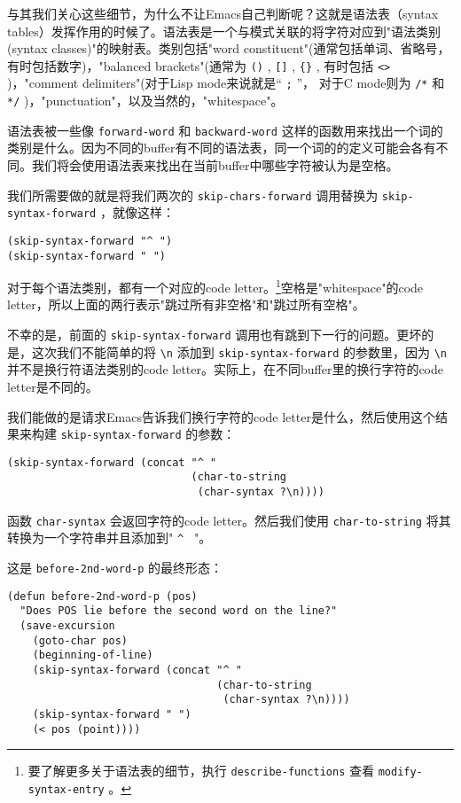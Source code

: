 与其我们关心这些细节，为什么不让Emacs自己判断呢？这就是语法表（syntax tables）发挥作用的时候了。语法表是一个与模式关联的将字符对应到"语法类别(syntax classes)"的映射表。类别包括"word constituent"(通常包括单词、省略号，有时包括数字)，"balanced brackets"(通常为 \verb|()| , \verb|[]| , \verb|{}| , 有时包括 \verb|<>| )，"comment delimiters"(对于Lisp mode来说就是“ \verb|;| ”， 对于C mode则为 \verb|/*| 和 \verb|*/| )，"punctuation"，以及当然的，"whitespace"。

语法表被一些像 \texttt{forward-word} 和 \texttt{backward-word} 这样的函数用来找出一个词的类别是什么。因为不同的buffer有不同的语法表，同一个词的的定义可能会各有不同。我们将会使用语法表来找出在当前buffer中哪些字符被认为是空格。

我们所需要做的就是将我们两次的 \texttt{skip-chars-forward} 调用替换为 \texttt{skip-syntax-forward} ，就像这样：

\begin{verbatim}
(skip-syntax-forward "^ ")
(skip-syntax-forward " ")
\end{verbatim}

对于每个语法类别，都有一个对应的code letter。\footnote{要了解更多关于语法表的细节，执行 \texttt{describe-functions} 查看 \texttt{modify-syntax-entry} 。}空格是"whitespace"的code letter，所以上面的两行表示"跳过所有非空格"和"跳过所有空格"。

不幸的是，前面的 \texttt{skip-syntax-forward} 调用也有跳到下一行的问题。更坏的是，这次我们不能简单的将 \verb|\n| 添加到 \texttt{skip-syntax-forward} 的参数里，因为 \verb|\n| 并不是换行符语法类别的code letter。实际上，在不同buffer里的换行字符的code letter是不同的。

我们能做的是请求Emacs告诉我们换行字符的code letter是什么，然后使用这个结果来构建 \texttt{skip-syntax-forward} 的参数：

\begin{verbatim}
(skip-syntax-forward (concat "^ "
                             (char-to-string
                              (char-syntax ?\n))))
\end{verbatim}

函数 \texttt{char-syntax} 会返回字符的code letter。然后我们使用 \texttt{char-to-string} 将其转换为一个字符串并且添加到" \verb|^ | "。

这是 \texttt{before-2nd-word-p} 的最终形态：

\begin{verbatim}
(defun before-2nd-word-p (pos)
  "Does POS lie before the second word on the line?"
  (save-excursion
    (goto-char pos)
    (beginning-of-line)
    (skip-syntax-forward (concat "^ "
                                 (char-to-string
                                  (char-syntax ?\n))))
    (skip-syntax-forward " ")
    (< pos (point))))
\end{verbatim}

